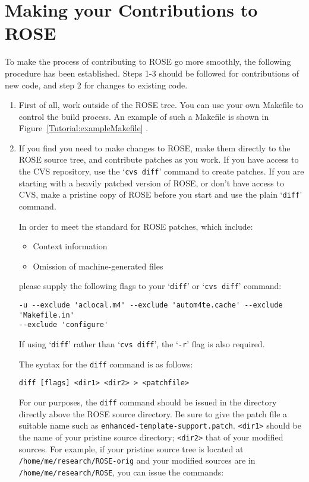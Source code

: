 \chapter{Making your Contributions to ROSE}

To make the process of contributing to ROSE go more smoothly, the following procedure has
been established.  Steps 1-3 should be followed for contributions of new code, and
step 2 for changes to existing code.

\begin{enumerate}
\item First of all, work outside of the ROSE tree.  You can use your own Makefile to control the build process.  An example of such a Makefile is shown in Figure~\ref{Tutorial:exampleMakefile} .

\item If you find you need to make changes to ROSE, make them directly to the ROSE source tree, and contribute patches as you work.  If you have access to the CVS repository, use the `\verb|cvs diff|' command to create patches.  If you are starting with a heavily patched version of ROSE, or don't have access to CVS, make a pristine copy of ROSE before you start and use the plain `\verb|diff|' command.

In order to meet the standard for ROSE patches, which include:
\begin{itemize}
\item Context information
\item Omission of machine-generated files
\end{itemize}
please supply the following flags to your `\verb|diff|' or `\verb|cvs diff|' command:

\begin{verbatim}
-u --exclude 'aclocal.m4' --exclude 'autom4te.cache' --exclude 'Makefile.in'
--exclude 'configure'
\end{verbatim}

If using `\verb|diff|' rather than `\verb|cvs diff|', the `\verb|-r|' flag is also required.

The syntax for the \verb|diff| command is as follows:

\begin{verbatim}
diff [flags] <dir1> <dir2> > <patchfile>
\end{verbatim}

For our purposes, the \verb|diff| command should be issued in the directory directly above the ROSE source directory.  Be sure to give the patch file a suitable name such as \verb|enhanced-template-support.patch|.  \verb|<dir1>| should be the name of your pristine source directory; \verb|<dir2>| that of your modified sources.  For example, if your pristine source tree is located at \verb|/home/me/research/ROSE-orig| and your modified sources are in \verb|/home/me/research/ROSE|, you can issue the commands:


\end{enumerate}
